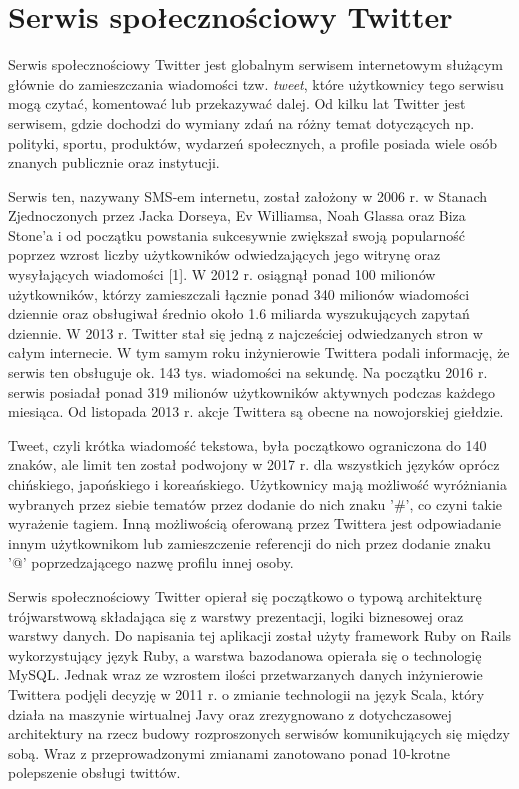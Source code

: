 \chapter{Serwis społecznościowy Twitter}
\qquad Serwis spo\l{}eczno\'sciowy Twitter jest globalnym serwisem internetowym s\l{}u\.z\k{a}cym g\l{}\'ownie do zamieszczania wiadomo\'sci tzw. \textit{tweet}, kt\'ore u\.zytkownicy tego serwisu mog\k{a} czytać, komentowa\'c lub przekazywa\'c dalej. Od kilku lat Twitter jest serwisem, gdzie dochodzi do wymiany zdań na różny temat dotyczących np. polityki, sportu, produktów, wydarzeń społecznych, a profile posiada wiele osób znanych publicznie oraz instytucji.

Serwis ten, nazywany SMS-em internetu, zosta\l{} za\l{}o\.zony w 2006 r. w Stanach Zjednoczonych przez Jacka Dorseya, Ev Williamsa, Noah Glassa oraz Biza Stone’a i od początku powstania sukcesywnie zwi\k{e}ksza\l{} swoj\k{a} popularno\'s\'c poprzez wzrost liczby u\.zytkownik\'ow odwiedzaj\k{a}cych jego witryn\k{e} oraz wysy\l{}aj\k{a}cych wiadomo\'sci [1]. W 2012 r. osiągnął ponad 100 milionów użytkowników, którzy zamieszczali łącznie ponad 340 milionów wiadomo\'sci dziennie oraz obsługiwał \'srednio około 1.6 miliarda wyszukujących zapytań dziennie. W 2013 r. Twitter stał si\k{e} jedną z najcze\'sciej odwiedzanych stron w całym internecie. W tym samym roku inżynierowie Twittera podali informację, że serwis ten obsługuje ok. 143 tys. wiadomości na sekundę. Na początku 2016 r. serwis posiadał ponad 319 milionów użytkowników aktywnych podczas każdego miesiąca. Od listopada 2013 r. akcje Twittera są obecne na nowojorskiej giełdzie.

Tweet, czyli krótka wiadomość tekstowa, by\l{}a pocz\k{a}tkowo ograniczona do 140 znak\'ow, ale limit ten zosta\l{} podwojony w 2017 r. dla wszystkich j\k{e}zyk\'ow opr\'ocz chi\'nskiego, japo\'nskiego i korea\'nskiego. Użytkownicy mają możliwość wyróżniania wybranych przez siebie tematów przez dodanie do nich znaku '\#', co czyni takie wyrażenie tagiem. Inną możliwością oferowaną przez Twittera jest odpowiadanie innym użytkownikom lub zamieszczenie referencji do nich przez dodanie znaku '@' poprzedzającego nazwę profilu innej osoby.

Serwis społecznościowy Twitter opierał się początkowo o typową architekturę trójwarstwową składająca się z warstwy prezentacji, logiki biznesowej oraz warstwy danych. Do napisania tej aplikacji został użyty framework Ruby on Rails wykorzystujący język Ruby, a warstwa bazodanowa opierała się o technologię MySQL. Jednak wraz ze wzrostem ilości przetwarzanych danych inżynierowie Twittera podjęli decyzję w 2011 r. o zmianie technologii na język Scala, który działa na maszynie wirtualnej Javy oraz zrezygnowano z dotychczasowej architektury na rzecz budowy rozproszonych serwisów komunikujących się między sobą. Wraz z przeprowadzonymi zmianami zanotowano ponad 10-krotne polepszenie obsługi twittów. 

